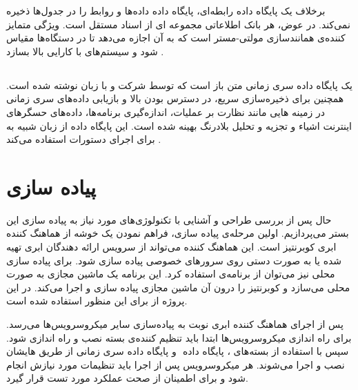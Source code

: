 برخلاف یک پایگاه داده رابطه‌ای، پایگاه داده  داده‌ها و روابط را در جدول‌ها ذخیره نمی‌کند. در عوض، هر بانک اطلاعاتی مجموعه ای از اسناد مستقل است. ویژگی متمایز کننده‌ی  همانند‌سازی ‌مولتی-مستر است که به آن اجازه می‌دهد تا در دستگاه‌ها مقیاس شود و سیستم‌های با کارایی بالا بسازد \cite{couchdb}.

\subsection{}

 یک پایگاه داده سری زمانی متن باز است که توسط شرکت  و با زبان  نوشته شده است. همچنین برای ذخیره‌سازی سریع، در دسترس بودن بالا و بازیابی داده‌های سری زمانی در زمینه هایی مانند نظارت بر عملیات، اندازه‌گیری برنامه‌ها، داده‌های حسگرهای اینترنت اشیاء و تجزیه و تحلیل بلادرنگ بهینه شده است. این پایگاه داده از زبان شبیه به  برای اجرای دستورات استفاده می‌کند \cite{influxdb}.

\newpage

\section{پیاده سازی}

حال پس از بررسی طراحی و آشنایی با تکنولوژی‌های مورد نیاز به پیاده سازی این بستر می‌پردازیم. اولین مرحله‌ی پیاده سازی، فراهم نمودن یک خوشه از هماهنگ کننده ابری کوبرنتیز است. این هماهنگ کننده می‌تواند از سرویس‌ ارائه دهندگان ابری تهیه شده یا به صورت دستی روی سرور‌های خصوصی ‌پیاده سازی شود. برای پیاده سازی محلی نیز می‌توان از برنامه‌ی  استفاده کرد. این برنامه یک ماشین مجازی به صورت محلی می‌سازد و کوبرنتیز را درون آن ماشین مجازی پیاده سازی و اجرا می‌کند. در این پروژه از  برای این منظور استفاده شده است.

پس از اجرای هماهنگ کننده ابری نوبت به پیاده‌سازی سایر میکروسرویس‌ها می‌رسد. برای راه اندازی میکروسرویس‌ها ابتدا باید تنظیم کننده‌ی بسته  نصب و راه اندازی شود. سپس با استفاده از  بسته‌های ، پایگاه داده ‌ و پایگاه داده سری زمانی  از طریق  هایشان نصب و اجرا می‌شوند. هر میکروسرویس پس از اجرا باید تنظیمات مورد نیازش انجام شود و برای اطمینان از صحت عملکرد مورد تست قرار گیرد.

\subsection{}

